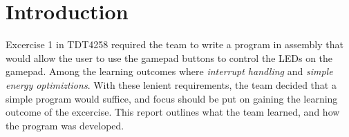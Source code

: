 \section{Introduction}
Excercise 1 in TDT4258 required the team to write a program in assembly that would allow the user to use the gamepad buttons to control the LEDs on the gamepad.
Among the learning outcomes where \emph{interrupt handling} and \emph{simple energy optimiztions}.
With these lenient requirements, the team decided that a simple program would suffice, and focus should be put on gaining the learning outcome of the excercise.
This report outlines what the team learned, and how the program was developed.

